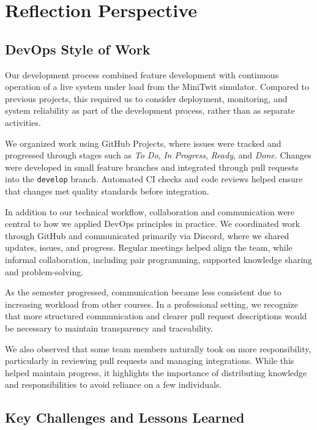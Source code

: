 \section{Reflection Perspective}

\subsection{DevOps Style of Work}

Our development process combined feature development with continuous operation of a live system under load from the MiniTwit simulator. Compared to previous projects, this required us to consider deployment, monitoring, and system reliability as part of the development process, rather than as separate activities.

We organized work using GitHub Projects, where issues were tracked and progressed through stages such as \textit{To Do}, \textit{In Progress}, \textit{Ready}, and \textit{Done}. Changes were developed in small feature branches and integrated through pull requests into the \texttt{develop} branch. Automated CI checks and code reviews helped ensure that changes met quality standards before integration.

In addition to our technical workflow, collaboration and communication were central to how we applied DevOps principles in practice. We coordinated work through GitHub and communicated primarily via Discord, where we shared updates, issues, and progress. Regular meetings helped align the team, while informal collaboration, including pair programming, supported knowledge sharing and problem-solving.

As the semester progressed, communication became less consistent due to increasing workload from other courses. In a professional setting, we recognize that more structured communication and clearer pull request descriptions would be necessary to maintain transparency and traceability.

We also observed that some team members naturally took on more responsibility, particularly in reviewing pull requests and managing integrations. While this helped maintain progress, it highlights the importance of distributing knowledge and responsibilities to avoid reliance on a few individuals.

\subsection{Key Challenges and Lessons Learned}

